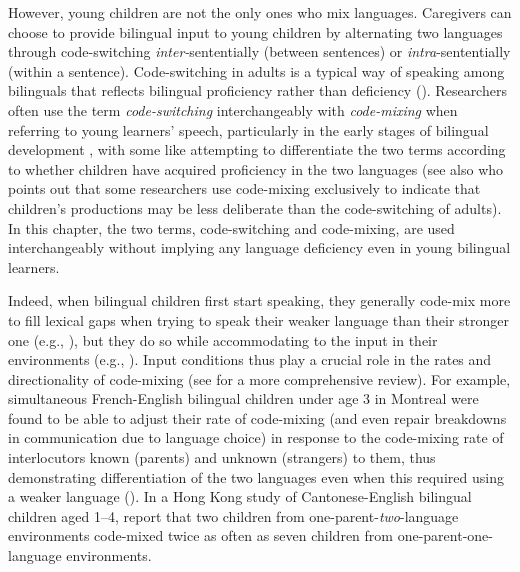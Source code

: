 \documentclass[output=paper,colorlinks,citecolor=brown]{langscibook}
\begin{document}
However, young children are not the only ones who mix languages. Caregivers can choose to provide bilingual input to young children by alternating two languages through code-switching \textit{inter-}sententially (between sentences) or \textit{intra}{}-sententially (within a sentence). Code-switching in adults is a typical way of speaking among bilinguals that reflects bilingual proficiency rather than deficiency (\citealt{BullockToribio2009, MacSwan2016}). Researchers often use the term \textit{code-switching} interchangeably with \textit{code-mixing} when referring to young learners’ speech, particularly in the early stages of bilingual development \citep{YowEtAl2016}, with some like \citet{Meisel1994} attempting to differentiate the two terms according to whether children have acquired proficiency in the two languages (see also \citealt{Nicoladis2013} who points out that some researchers use code-mixing exclusively to indicate that children’s productions may be less deliberate than the code-switching of adults). In this chapter, the two terms, code-switching and code-mixing, are used interchangeably without implying any language deficiency even in young bilingual learners. 

Indeed, when bilingual children first start speaking, they generally code-mix more to fill lexical gaps when trying to speak their weaker language than their stronger one (e.g., \citealt{DeucharQuay1999}), but they do so while accommodating to the input in their environments (e.g., \citealt{Lanza1997}). Input conditions thus play a crucial role in the rates and directionality of code-mixing (see \citealt{Deuchar2022} for a more comprehensive review). For example, simultaneous French-English bilingual children under age 3 in Montreal were found to be able to adjust their rate of code-mixing (and even repair breakdowns in communication due to language choice) in response to the code-mixing rate of interlocutors known (parents) and unknown (strangers) to them, thus demonstrating differentiation of the two languages even when this required using a weaker language (\citealt{ComeauEtAl2003, ComeauEtAl2007}). In a Hong Kong study of Cantonese-English bilingual children aged 1–4, \citet{YipMatthews2016} report that two children from one-parent-\textit{two}{}-language environments code-mixed twice as often as seven children from one-parent-one-language environments. 
\end{document}
